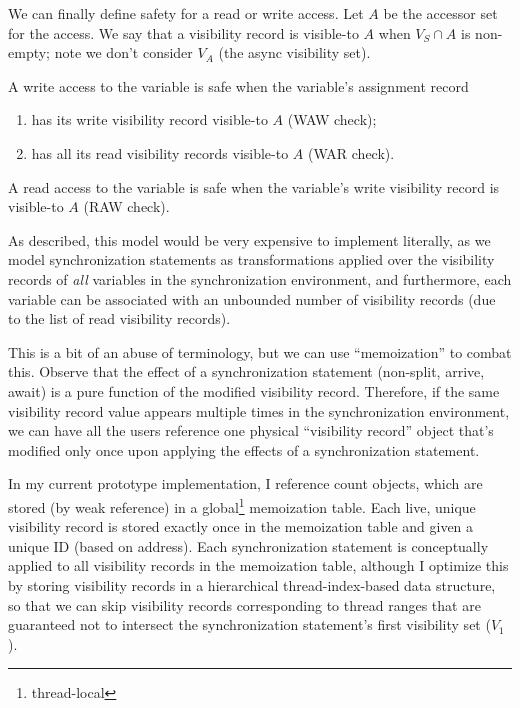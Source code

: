 \filbreak
{} We can finally define safety for a read or write access.
Let $A$ be the accessor set for the access.
We say that a visibility record is visible-to $A$ when ${V_S \cap A}$ is non-empty; note we don't consider $V_A$ (the async visibility set).

A write access to the variable is safe when the variable's assignment record
\begin{enumerate}
  \item has its write visibility record visible-to $A$ (WAW check);
  \item has all its read visibility records visible-to $A$ (WAR check).
\end{enumerate}
A read access to the variable is safe when the variable's write visibility record is visible-to $A$ (RAW check).



\filbreak
{}

 As described, this model would be very expensive to implement literally, as we model synchronization statements as transformations applied over the visibility records of \textit{all} variables in the synchronization environment, and furthermore, each variable can be associated with an unbounded number of visibility records (due to the list of read visibility records).

\filbreak
This is a bit of an abuse of terminology, but we can use ``memoization'' to combat this.
Observe that the effect of a synchronization statement (non-split, arrive, await) is a pure function of the modified visibility record.
Therefore, if the same visibility record value appears multiple times in the synchronization environment, we can have all the users reference one physical ``visibility record'' object that's modified only once upon applying the effects of a synchronization statement.

\filbreak
In my current prototype implementation, I reference count  objects, which are stored (by weak reference) in a global\footnote{thread-local} memoization table.
Each live, unique visibility record is stored exactly once in the memoization table and given a unique ID (based on address).
Each synchronization statement is conceptually applied to all visibility records in the memoization table, although I optimize this by storing visibility records in a hierarchical thread-index-based data structure, so that we can skip visibility records corresponding to thread ranges that are guaranteed not to intersect the synchronization statement's first visibility set ($V_1$).

